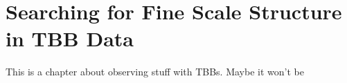 \doublespacing
\chapter{Searching for Fine Scale Structure in TBB Data}
\label{chap:tbb}
This is a chapter about observing stuff with TBBs. Maybe it won't be